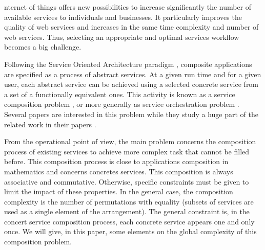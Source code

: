 \documentclass[10pt,journal,compsoc]{IEEEtran}
\begin{document}
%
\IEEEpeerreviewmaketitle




nternet of things offers new possibilities to increase significantly the number of available services to individuals and businesses. It particularly improves the quality of web services and increases in the same time complexity and number of web services. Thus, selecting an appropriate and optimal services workflow becomes a big challenge.

Following  the Service Oriented Architecture paradigm \cite{Alrifai:2010}, composite applications are specified as a process of abstract services. At a given run time and for a given user, each abstract service can be achieved using a selected concrete service from a set of a functionally equivalent ones. This activity is known as a service composition problem \cite{}, or more generally as service orchestration problem \cite{Papazoglou2007}. Several papers are interested in this problem while they study a huge part of the related work in their papers \cite{Essaid2017,Zheng2015}. 

From the operational point of view, the main problem concerns the composition process of existing services to achieve more complex task that cannot be filled before. This composition process is close to  applications composition in mathematics and concerns concretes services. This composition is always associative and commutative. Otherwise, specific constraints must be given to limit the impact of these properties. In the general case, the composition complexity is the number of permutations with equality (subsets of services are used as a single element of the arrangement). The general constraint is, in the concert service composition process, each concrete service appears one and only once. We will give, in this paper, some elements on the global complexity of this composition problem. 
\end{document}
